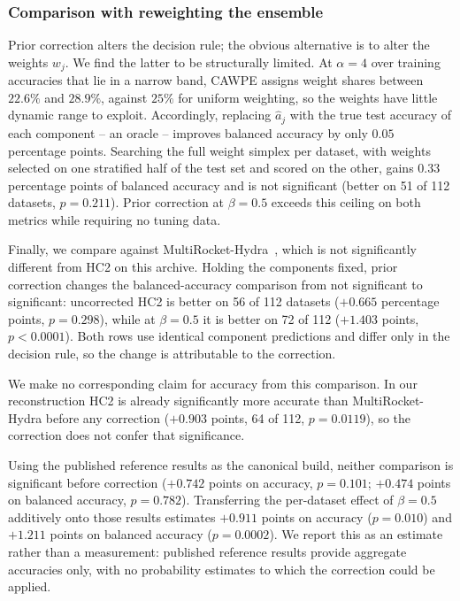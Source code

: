\subsubsection{Comparison with reweighting the ensemble}
\label{sec:pc-comparison}

Prior correction alters the decision rule; the obvious alternative is to alter the
weights $w_j$. We find the latter to be structurally limited. At $\alpha=4$ over training
accuracies that lie in a narrow band, CAWPE assigns weight shares between $22.6\%$ and
$28.9\%$, against $25\%$ for uniform weighting, so the weights have little dynamic range
to exploit. Accordingly, replacing $\hat{a}_j$ with the true test accuracy of each
component -- an oracle -- improves balanced accuracy by only $0.05$ percentage points.
Searching the full weight simplex per dataset, with weights selected on one stratified
half of the test set and scored on the other, gains $0.33$ percentage points of balanced
accuracy and is not significant (better on 51 of 112 datasets, $p = 0.211$). Prior
correction at $\beta = 0.5$ exceeds this ceiling on both metrics while requiring no
tuning data.

Finally, we compare against MultiRocket-Hydra~\cite{dempster2023hydra}, which is not
significantly different from HC2 on this archive. Holding the components fixed, prior
correction changes the balanced-accuracy comparison from not significant to significant:
uncorrected HC2 is better on 56 of 112 datasets ($+0.665$ percentage points, $p=0.298$),
while at $\beta=0.5$ it is better on 72 of 112 ($+1.403$ points, $p<0.0001$). Both rows
use identical component predictions and differ only in the decision rule, so the change
is attributable to the correction.

We make no corresponding claim for accuracy from this comparison. In our reconstruction
HC2 is already significantly more accurate than MultiRocket-Hydra before any correction
($+0.903$ points, 64 of 112, $p=0.0119$), so the correction does not confer that
significance.

Using the published reference results as the canonical build, neither comparison is
significant before correction ($+0.742$ points on accuracy, $p=0.101$; $+0.474$ points
on balanced accuracy, $p=0.782$). Transferring the per-dataset effect of $\beta=0.5$
additively onto those results estimates $+0.911$ points on accuracy ($p=0.010$) and
$+1.211$ points on balanced accuracy ($p=0.0002$). We report this as an estimate rather
than a measurement: published reference results provide aggregate accuracies only, with
no probability estimates to which the correction could be applied.

